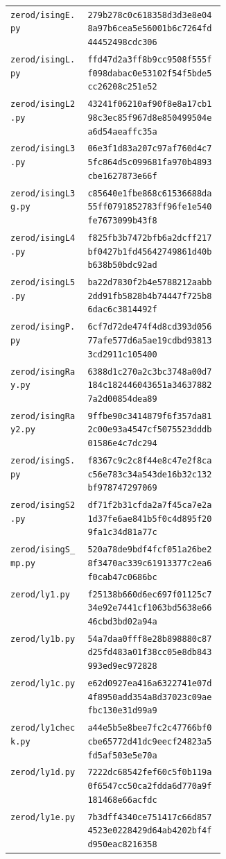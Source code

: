\documentclass[11pt]{article}
\begin{document}
{\begin{longtable}{@{}p{0.36\linewidth}l@{}}
\texttt{zerod/isingE.py} & \texttt{279b278c0c618358d3d3e8e048a97b6cea5e56001b6c7264fd44452498cdc306}\\
\texttt{zerod/isingL.py} & \texttt{ffd47d2a3ff8b9cc9508f555ff098dabac0e53102f54f5bde5cc26208c251e52}\\
\texttt{zerod/isingL2.py} & \texttt{43241f06210af90f8e8a17cb198c3ec85f967d8e850499504ea6d54aeaffc35a}\\
\texttt{zerod/isingL3.py} & \texttt{06e3f1d83a207c97af760d4c75fc864d5c099681fa970b4893cbe1627873e66f}\\
\texttt{zerod/isingL3g.py} & \texttt{c85640e1fbe868c61536688da55ff0791852783ff96fe1e540fe7673099b43f8}\\
\texttt{zerod/isingL4.py} & \texttt{f825fb3b7472bfb6a2dcff217bf0427b1fd45642749861d40bb638b50bdc92ad}\\
\texttt{zerod/isingL5.py} & \texttt{ba22d7830f2b4e5788212aabb2dd91fb5828b4b74447f725b86dac6c3814492f}\\
\texttt{zerod/isingP.py} & \texttt{6cf7d72de474f4d8cd393d05677afe577d6a5ae19cdbd938133cd2911c105400}\\
\texttt{zerod/isingRay.py} & \texttt{6388d1c270a2c3bc3748a00d7184c182446043651a346378827a2d00854dea89}\\
\texttt{zerod/isingRay2.py} & \texttt{9ffbe90c3414879f6f357da812c00e93a4547cf5075523dddb01586e4c7dc294}\\
\texttt{zerod/isingS.py} & \texttt{f8367c9c2c8f44e8c47e2f8cac56e783c34a543de16b32c132bf978747297069}\\
\texttt{zerod/isingS2.py} & \texttt{df71f2b31cfda2a7f45ca7e2a1d37fe6ae841b5f0c4d895f209fa1c34d81a77c}\\
\texttt{zerod/isingS\_mp.py} & \texttt{520a78de9bdf4fcf051a26be28f3470ac339c61913377c2ea6f0cab47c0686bc}\\
\texttt{zerod/ly1.py} & \texttt{f25138b660d6ec697f01125c734e92e7441cf1063bd5638e6646cbd3bd02a94a}\\
\texttt{zerod/ly1b.py} & \texttt{54a7daa0fff8e28b898880c87d25fd483a01f38cc05e8db843993ed9ec972828}\\
\texttt{zerod/ly1c.py} & \texttt{e62d0927ea416a6322741e07d4f8950add354a8d37023c09aefbc130e31d99a9}\\
\texttt{zerod/ly1check.py} & \texttt{a44e5b5e8bee7fc2c47766bf0cbe65772d41dc9eecf24823a5fd5af503e5e70a}\\
\texttt{zerod/ly1d.py} & \texttt{7222dc68542fef60c5f0b119a0f6547cc50ca2fdda6d770a9f181468e66acfdc}\\
\texttt{zerod/ly1e.py} & \texttt{7b3dff4340ce751417c66d8574523e0228429d64ab4202bf4fd950eac8216358}\\

\end{longtable}}
\end{document}

